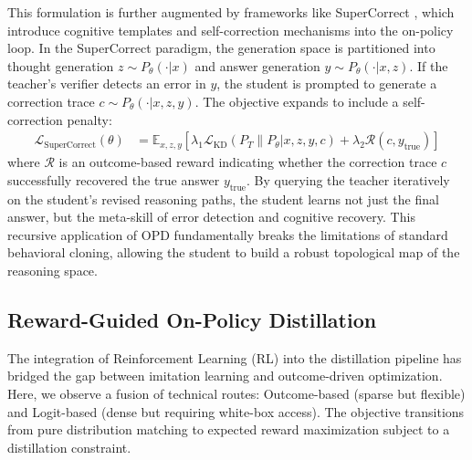 This formulation is further augmented by frameworks like SuperCorrect \citep{2410.09008}, which introduce cognitive templates and self-correction mechanisms into the on-policy loop. In the SuperCorrect paradigm, the generation space is partitioned into thought generation $z \sim P_\theta(\cdot|x)$ and answer generation $y \sim P_\theta(\cdot|x, z)$. If the teacher's verifier detects an error in $y$, the student is prompted to generate a correction trace $c \sim P_\theta(\cdot|x, z, y)$. The objective expands to include a self-correction penalty:
\begin{align}
\mathcal{L}_{\text{SuperCorrect}}(\theta) &= \mathbb{E}_{x, z, y} \left[ \lambda_1 \mathcal{L}_{\text{KD}}(P_T \parallel P_\theta | x, z, y, c) + \lambda_2 \mathcal{R}(c, y_{\text{true}}) \right]
\end{align}
where $\mathcal{R}$ is an outcome-based reward indicating whether the correction trace $c$ successfully recovered the true answer $y_{\text{true}}$. By querying the teacher iteratively on the student's revised reasoning paths, the student learns not just the final answer, but the meta-skill of error detection and cognitive recovery. This recursive application of OPD fundamentally breaks the limitations of standard behavioral cloning, allowing the student to build a robust topological map of the reasoning space.

\subsection{Reward-Guided On-Policy Distillation}
The integration of Reinforcement Learning (RL) into the distillation pipeline has bridged the gap between imitation learning and outcome-driven optimization. Here, we observe a fusion of technical routes: Outcome-based (sparse but flexible) and Logit-based (dense but requiring white-box access). The objective transitions from pure distribution matching to expected reward maximization subject to a distillation constraint.

